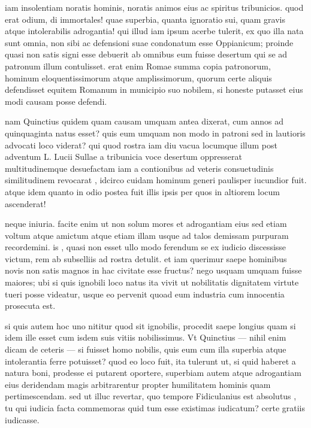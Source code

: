  iam insolentiam noratis hominis, noratis animos eius ac spiritus tribunicios. quod erat odium, di immortales! quae superbia, quanta ignoratio sui, quam gravis atque intolerabilis adrogantia! qui illud iam ipsum acerbe tulerit, ex quo illa nata sunt omnia, non sibi ac defensioni suae condonatum esse Oppianicum; proinde quasi non satis signi esse debuerit ab omnibus eum fuisse desertum qui se ad patronum illum contulisset. erat enim Romae summa copia patronorum, hominum eloquentissimorum atque amplissimorum, quorum certe aliquis defendisset equitem Romanum in municipio suo nobilem, si honeste putasset eius modi causam posse defendi.

 nam Quinctius quidem quam causam umquam antea dixerat, cum annos ad quinquaginta natus esset? quis eum umquam non modo in patroni sed in lautioris advocati loco viderat? qui quod rostra iam diu vacua locumque illum post adventum L. Lucii Sullae a tribunicia voce desertum oppresserat multitudinemque desuefactam iam a contionibus ad veteris consuetudinis similitudinem revocarat , idcirco cuidam hominum generi paulisper iucundior fuit. atque idem quanto in odio postea fuit illis ipsis per quos in altiorem locum ascenderat!

 neque iniuria. facite enim ut non solum mores et adrogantiam eius sed etiam voltum atque amictum atque etiam illam usque ad talos demissam purpuram recordemini. is , quasi non esset ullo modo ferendum se ex iudicio discessisse victum, rem ab subselliis ad rostra detulit. et iam querimur saepe hominibus novis non satis magnos in hac civitate esse fructus? nego usquam umquam fuisse maiores; ubi si quis ignobili loco natus ita vivit ut nobilitatis dignitatem virtute tueri posse videatur, usque eo pervenit quoad eum industria cum innocentia prosecuta est.

 si quis autem hoc uno nititur quod sit ignobilis, procedit saepe longius quam si idem ille esset cum isdem suis vitiis nobilissimus. Vt Quinctius — nihil enim dicam de ceteris — si fuisset homo nobilis, quis eum cum illa superbia atque intolerantia ferre potuisset? quod eo loco fuit, ita tulerunt ut, si quid haberet a natura boni, prodesse ei putarent oportere, superbiam autem atque adrogantiam eius deridendam magis arbitrarentur propter humilitatem hominis quam pertimescendam. sed ut illuc revertar, quo tempore Fidiculanius est absolutus , tu qui iudicia facta commemoras quid tum esse existimas iudicatum? certe gratiis iudicasse.

